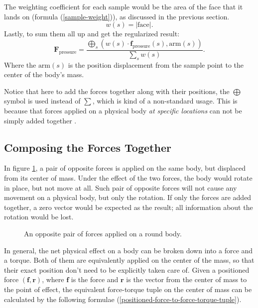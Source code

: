 The weighting coefficient for each sample would be the area of the face that it lands on (formula (\ref{sample-weight})), as discussed in the previous section.
\begin{equation}
	w(s)=|\text{face}|.
	\label{sample-weight}
\end{equation}
Lastly, to sum them all up and get the regularized result:
\begin{equation}
	\mathbf{F}_{\text{pressure}}=\frac
		{
			\bigoplus_{s}
			\left(
				w(s)\cdot\mathbf{f}_{\text{pressure}}(s)
				,
				\text{arm}(s)
			\right)
		}
		{\sum_{s}w(s)}.
	\label{net-pressure-force}
\end{equation}
Where the $\text{arm}(s)$ is the position displacement from the sample point to the center of the body's mass.

Notice that here to add the forces together along with their positions, the $\bigoplus$ symbol is used instead of $\sum$, which is kind of a non-standard usage.
This is because that forces applied on a physical body \emph{at specific locations} can not be simply added together \cite{mirtich1996impulse}.

\subsection{Composing the Forces Together}

In figure \ref{force-pair}, a pair of opposite forces is applied on the same body, but displaced from its center of mass.
Under the effect of the two forces, the body would rotate in place, but not move at all.
Such pair of opposite forces will not cause any movement on a physical body, but only the rotation.
If only the forces are added together, a zero vector would be expected as the result; all information about the rotation would be lost.

\begin{figure}[h]
	\centering
	\scalebox{0.8}{
		\begin{tikzpicture}
			\filldraw[color=black, fill=lightgray, line width=1pt] (0,0) circle (2);
			\draw[-latex, line width=1pt] (2,0) -- ++(0,-2);
			\draw[-latex, line width=1pt] (-2,0) -- ++(0,+2);
		\end{tikzpicture}
	}
	\caption{An opposite pair of forces applied on a round body.}
	\label{force-pair}
\end{figure}

In general, the net physical effect on a body can be broken down into a force and a torque.
Both of them are equivalently applied on the center of the mass, so that their exact position don't need to be explicitly taken care of.
Given a positioned force $(\mathbf{f}, \mathbf{r})$, where $\mathbf{f}$ is the force and $\mathbf{r}$ is the vector from the center of mass to the point of effect, the equivalent force-torque tuple on the center of mass can be calculated by the following formulae (\ref{positioned-force-to-force-torque-tuple}).


